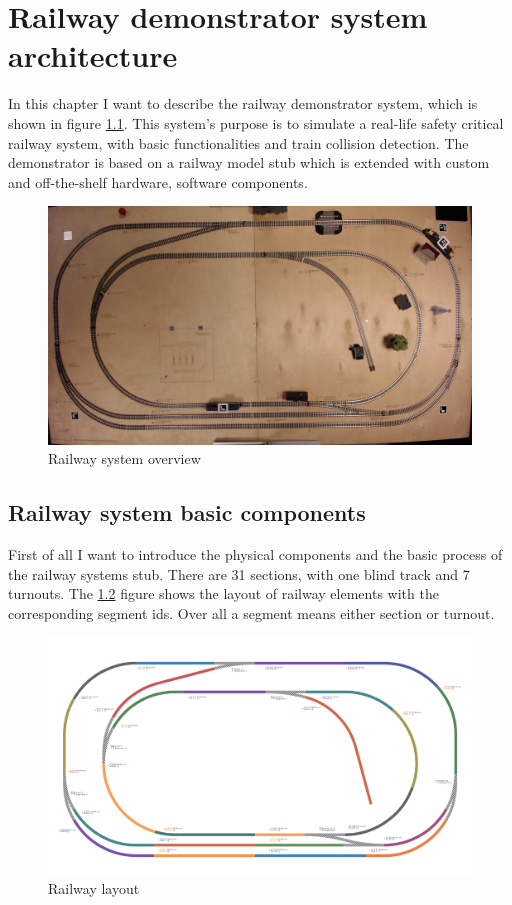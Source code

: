 
\chapter{Railway demonstrator system architecture}\label{chapter:RailwaySystem}
In this chapter I want to describe the railway demonstrator system, which is shown in figure \ref{fig:overview}. This system's purpose is to simulate a real-life safety critical railway system, with basic functionalities and train collision detection. The demonstrator is based on a railway model stub which is extended with custom and off-the-shelf hardware, software components. 
\begin{figure}[h]
	\centering
	\includegraphics[width=150mm]{figures/modes3/overview.jpg}
	\caption{Railway system overview}
	\label{fig:overview}
\end{figure}

\section{Railway system basic components}
First of all I want to introduce the physical components and the basic process of the railway systems stub. There are 31 sections, with one blind track and 7 turnouts. The \ref{fig:layout} figure shows the layout of railway elements with the corresponding segment ids. Over all a segment means either section or turnout.

\begin{figure}[h]
	\centering
	\includegraphics[width=150mm, keepaspectratio]{figures/modes3/layout2.png}
	\caption{Railway layout}
	\label{fig:layout}
\end{figure}

